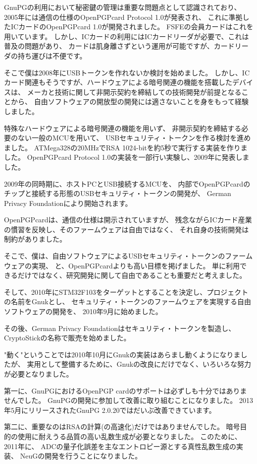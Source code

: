 \documentclass[mingoth,a4paper,twoside]{jsarticle}
\begin{document}
GnuPGの利用において秘密鍵の管理は重要な問題点として認識されており、
2005年には通信の仕様のOpenPGPcard Protocol 1.0が発表され、
これに準拠したICカードのOpenPGPcard 1.0が開発されました。
FSFEの会員カードはこれを用いています。
しかし、ICカードの利用にはICカードリーダが必要で、これは普及の問題があり、
カードは肌身離さずという運用が可能ですが、カードリーダの持ち運びは不便です。

そこで僕は2008年にUSBトークンを作れないか検討を始めました。
しかし、ICカード関連もそうですが、ハードウェアによる暗号関連の機能を搭載したデバイスは、
メーカと技術に関して非開示契約を締結しての技術開発が前提となることから、
自由ソフトウェアの開放型の開発には適さないことを身をもって経験しました。

特殊なハードウェアによる暗号関連の機能を用いず、
非開示契約を締結する必要のない一般のMCUを用いて、
USBセキュリティ・トークンを作る検討を進めました。
ATMega328の20MHzでRSA 1024-bitを約5秒で実行する実装を作りました。
OpenPGPcard Protocol 1.0の実装を一部行い実験し、2009年に発表しました。

2009年の同時期に、ホストPCとUSB接続するMCUを、
内部でOpenPGPcardのチップと接続する形態のUSBセキュリティ・トークンの開発が、
German Privacy Foundationにより開始されます。

OpenPGPcardは、通信の仕様は開示されていますが、
残念ながらICカード産業の慣習を反映し、そのファームウェアは自由ではなく、
それ自身の技術開発は制約がありました。

そこで、僕は、自由ソフトウェアによるUSBセキュリティ・トークンのファームウェアの実現、
と、OpenPGPcardよりも高い目標を掲げました。
単に利用できるだけではなく、研究開発に関して自由であることも重要だと考えました。

そして、2010年にSTM32F103をターゲットとすることを決定し、プロジェクトの名前をGnukとし、
セキュリティ・トークンのファームウェアを実現する自由ソフトウェアの開発を、
2010年9月に始めました。

その後、German Privacy Foundationはセキュリティ・トークンを製造し、
CryptoStickの名称で販売を始めました。

"動く"ということでは2010年10月にGnukの実装はあらまし動くようになりましたが、
実用として整備するために、Gnukの改良にだけでなく、いろいろな努力が必要となりました。

第一に、GnuPGにおけるOpenPGP cardのサポートは必ずしも十分ではありませんでした。
GnuPGの開発に参加して改善に取り組むことになりました。
2013年5月にリリースされたGnuPG 2.0.20ではだいぶ改善できています。

第二に、重要なのはRSAの計算(の高速化)だけではありませんでした。
暗号目的の使用に耐えうる品質の高い乱数生成が必要となりました。
このために、2011年に、
ADCの量子化誤差を主なエントロピー源とする真性乱数生成の実装、
NeuGの開発を行うことになりました。
\end{document}
